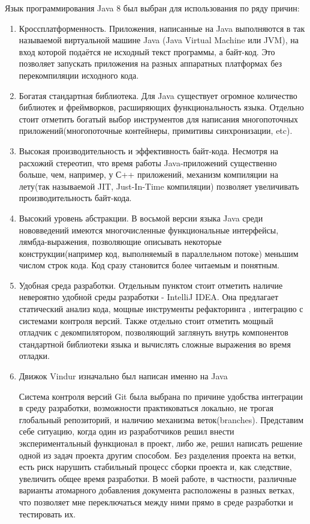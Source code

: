 \documentclass{matmex-diploma}
\begin{document}
        Язык программирования Java 8 был выбран для использования по ряду причин:
        \begin{enumerate}
            \item Кроссплатформенность. Приложения, написанные на Java выполняются в так называемой виртуальной машине Java (Java Virtual Machine или JVM), на вход которой подаётся не исходный текст программы, а байт-код. Это позволяет запускать приложения на разных аппаратных платформах без перекомпиляции исходного кода.
            \item Богатая стандартная библиотека. Для Java существует огромное количество библиотек и фреймворков, расширяющих функциональность языка. Отдельно стоит отметить богатый выбор инструментов для написания многопоточных приложений(многопоточные контейнеры, примитивы синхронизации, etc).   
            \item Высокая производительность и эффективность байт-кода. Несмотря на расхожий стереотип, что время работы Java-приложений существенно больше, чем, например, у С++ приложений, механизм компиляции на лету(так называемой JIT, Just-In-Time компиляции) позволяет увеличивать производительность байт-кода.
            \item Высокий уровень абстракции. В восьмой версии языка Java среди нововведений имеются многочисленные функциональные интерфейсы, лямбда-выражения, позволяющие описывать некоторые конструкции(например код, выполняемый в параллельном потоке) меньшим числом строк кода. Код сразу становится более читаемым и понятным.  
            \item Удобная среда разработки. Отдельным пунктом стоит отметить наличие невероятно удобной среды разработки - IntelliJ IDEA. Она предлагает статический анализ кода, мощные инструменты рефакторинга , интеграцию с системами контроля версий. Также отдельно стоит отметить мощный отладчик с декомпилятором, позволяющий заглянуть внутрь компонентов стандартной библиотеки языка и вычислять сложные выражения во время отладки.
            \item Движок Vindur изначально был написан именно на Java
            
        Система контроля версий Git была выбрана по причине удобства интеграции в среду разработки, возможности практиковаться локально, не трогая глобальный репозиторий, и наличию механизма веток(branches). Представим себе ситуацию, когда один из разработчиков решил внести экспериментальный функционал в проект, либо же, решил написать решение одной из задач проекта другим способом. Без разделения проекта на ветки, есть риск нарушить стабильный процесс сборки проекта и, как следствие, увеличить общее время разработки. В моей работе, в частности, различные варианты атомарного добавления документа расположены в разных ветках, что позволяет мне переключаться между ними прямо в среде разработки и тестировать их.
        

\end{enumerate}
\end{document}
